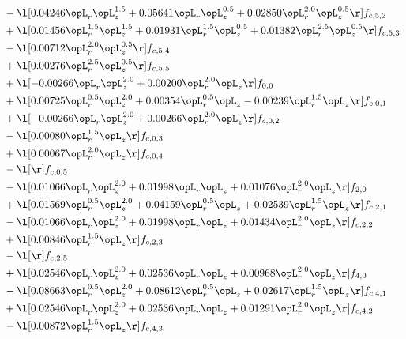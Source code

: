 \begin{alignat}{2}
& - \l[  0.04246 \opL_r \opL_z^{1.5} +  0.05641 \opL_r \opL_z^{0.5} +  0.02850 \opL_r^{2.0} \opL_z^{0.5}  \r] f_{c,5,2} \nonumber \\ 
& + \l[  0.01456 \opL_r^{1.5} \opL_z^{1.5} +  0.01931 \opL_r^{1.5} \opL_z^{0.5} +  0.01382 \opL_r^{2.5} \opL_z^{0.5}  \r] f_{c,5,3} \nonumber \\ 
& - \l[  0.00712 \opL_r^{2.0} \opL_z^{0.5}  \r] f_{c,5,4} \nonumber \\ 
& + \l[  0.00276 \opL_r^{2.5} \opL_z^{0.5}  \r] f_{c,5,5} \nonumber \\ 
& + \l[  -0.00266 \opL_r \opL_z^{2.0} +  0.00200 \opL_r^{2.0} \opL_z  \r] f_{0,0} \nonumber \\ 
& + \l[  0.00725 \opL_r^{0.5} \opL_z^{2.0} +  0.00354 \opL_r^{0.5} \opL_z   -0.00239 \opL_r^{1.5} \opL_z  \r] f_{c,0,1} \nonumber \\ 
& + \l[  -0.00266 \opL_r \opL_z^{2.0} +  0.00266 \opL_r^{2.0} \opL_z  \r] f_{c,0,2} \nonumber \\ 
& - \l[  0.00080 \opL_r^{1.5} \opL_z  \r] f_{c,0,3} \nonumber \\ 
& + \l[  0.00067 \opL_r^{2.0} \opL_z  \r] f_{c,0,4} \nonumber \\ 
& - \l[  \r] f_{c,0,5} \nonumber \\ 
& - \l[  0.01066 \opL_r \opL_z^{2.0} +  0.01998 \opL_r \opL_z +  0.01076 \opL_r^{2.0} \opL_z  \r] f_{2,0} \nonumber \\ 
& + \l[  0.01569 \opL_r^{0.5} \opL_z^{2.0} +  0.04159 \opL_r^{0.5} \opL_z +  0.02539 \opL_r^{1.5} \opL_z  \r] f_{c,2,1} \nonumber \\ 
& - \l[  0.01066 \opL_r \opL_z^{2.0} +  0.01998 \opL_r \opL_z +  0.01434 \opL_r^{2.0} \opL_z  \r] f_{c,2,2} \nonumber \\ 
& + \l[  0.00846 \opL_r^{1.5} \opL_z  \r] f_{c,2,3} \nonumber \\ 
& - \l[  \r] f_{c,2,5} \nonumber \\ 
& + \l[  0.02546 \opL_r \opL_z^{2.0} +  0.02536 \opL_r \opL_z +  0.00968 \opL_r^{2.0} \opL_z  \r] f_{4,0} \nonumber \\ 
& - \l[  0.08663 \opL_r^{0.5} \opL_z^{2.0} +  0.08612 \opL_r^{0.5} \opL_z +  0.02617 \opL_r^{1.5} \opL_z  \r] f_{c,4,1} \nonumber \\ 
& + \l[  0.02546 \opL_r \opL_z^{2.0} +  0.02536 \opL_r \opL_z +  0.01291 \opL_r^{2.0} \opL_z  \r] f_{c,4,2} \nonumber \\ 
& - \l[  0.00872 \opL_r^{1.5} \opL_z  \r] f_{c,4,3} \nonumber \\ 

\end{alignat}
